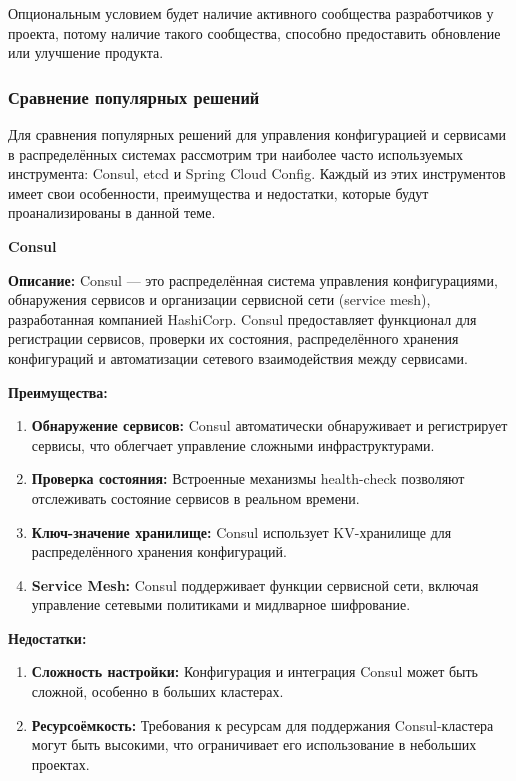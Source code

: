 Опциональным условием будет наличие активного сообщества разработчиков у проекта, потому наличие такого сообщества,
способно предоставить обновление или улучшение продукта.

\subsubsection{Сравнение популярных решений}

Для сравнения популярных решений для управления конфигурацией и сервисами в распределённых системах рассмотрим три
наиболее часто используемых инструмента: Consul, etcd и Spring Cloud Config.
Каждый из этих инструментов имеет свои
особенности, преимущества и недостатки, которые будут проанализированы в данной теме.

\textbf{Consul}

\textbf{Описание:} Consul — это распределённая система управления конфигурациями, обнаружения сервисов и организации сервисной сети (service mesh), разработанная компанией HashiCorp.
Consul предоставляет функционал для регистрации сервисов, проверки их состояния, распределённого хранения конфигураций и автоматизации сетевого взаимодействия между сервисами.

\textbf{Преимущества:}
\begin{enumerate}[label=\arabic*.]
    \item \textbf{Обнаружение сервисов:} Consul автоматически обнаруживает и регистрирует сервисы, что облегчает управление сложными инфраструктурами.
    \item \textbf{Проверка состояния:} Встроенные механизмы health-check позволяют отслеживать состояние сервисов в реальном времени.
    \item \textbf{Ключ-значение хранилище:} Consul использует KV-хранилище для распределённого хранения конфигураций.
    \item \textbf{Service Mesh:} Consul поддерживает функции сервисной сети, включая управление сетевыми политиками и мидлварное шифрование.
\end{enumerate}

\textbf{Недостатки:}
\begin{enumerate}[label=\arabic*.]
    \item \textbf{Сложность настройки:} Конфигурация и интеграция Consul может быть сложной, особенно в больших кластерах.
    \item \textbf{Ресурсоёмкость:} Требования к ресурсам для поддержания Consul-кластера могут быть высокими, что ограничивает его использование в небольших проектах.
\end{enumerate}


